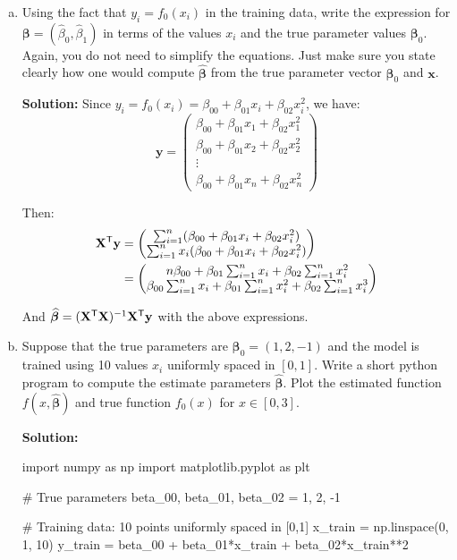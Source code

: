 \documentclass[11pt]{article}
\newcommand{\xbf}{\mathbf{x}}
\newcommand{\ybf}{\mathbf{y}}
\newcommand{\Xbf}{\mathbf{X}}
\def\betahat{\widehat{\beta}}
\def\betabf{{\boldsymbol \beta}}
\def\betabfhat{{\widehat{\bm{\beta}}}}
\newcommand{\tran}{^{\text{\sf T}}}
\begin{document}
\begin{enumerate}
\begin{enumerate}[(a)]
\item Using the fact that $y_i=f_0(x_i)$ in the training data, write the expression for
$\betabf = (\betahat_0,\betahat_1)$ in terms of the values $x_i$ and the true parameter
values $\betabf_0$.
Again, you do not need to simplify the equations.
Just make sure you state clearly how one would compute $\betabfhat$ from the true
parameter vector $\betabf_0$ and $\xbf$.

\textbf{Solution:}
Since $y_i = f_0(x_i) = \beta_{00} + \beta_{01}x_i + \beta_{02}x_i^2$, we have:
\[
\ybf = \begin{pmatrix}
\beta_{00} + \beta_{01}x_1 + \beta_{02}x_1^2 \\
\beta_{00} + \beta_{01}x_2 + \beta_{02}x_2^2 \\
\vdots \\
\beta_{00} + \beta_{01}x_n + \beta_{02}x_n^2
\end{pmatrix}
\]

Then:
\begin{align}
\Xbf\tran\ybf &= \begin{pmatrix} 
\sum_{i=1}^n (\beta_{00} + \beta_{01}x_i + \beta_{02}x_i^2) \\
\sum_{i=1}^n x_i(\beta_{00} + \beta_{01}x_i + \beta_{02}x_i^2)
\end{pmatrix} \\
&= \begin{pmatrix}
n\beta_{00} + \beta_{01}\sum_{i=1}^n x_i + \beta_{02}\sum_{i=1}^n x_i^2 \\
\beta_{00}\sum_{i=1}^n x_i + \beta_{01}\sum_{i=1}^n x_i^2 + \beta_{02}\sum_{i=1}^n x_i^3
\end{pmatrix}
\end{align}

And $\betabfhat = (\Xbf\tran\Xbf)^{-1}\Xbf\tran\ybf$ with the above expressions.

\item
Suppose that the true parameters are $\betabf_0=(1,2,-1)$ and
the model is trained using 10 values $x_i$ uniformly spaced in $[0,1]$.
Write a short python program to compute the estimate parameters $\betabfhat$.
Plot the estimated function $f(x,\betabfhat)$ and true function $f_0(x)$
 for $x \in [0,3]$.

\textbf{Solution:}
\begin{python}
import numpy as np
import matplotlib.pyplot as plt

# True parameters
beta_00, beta_01, beta_02 = 1, 2, -1

# Training data: 10 points uniformly spaced in [0,1]
x_train = np.linspace(0, 1, 10)
y_train = beta_00 + beta_01*x_train + beta_02*x_train**2


\end{python}
\end{enumerate}
\end{enumerate}
\end{document}
